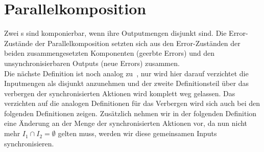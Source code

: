 \section{Parallelkomposition}
Zwei \EIO{}s sind komponierbar, wenn ihre Outputmengen disjunkt sind. Die
Error-Zustän\-de der Parallelkomposition setzten sich aus den Error-Zuständen der
beiden zusammengesetzten Komponenten (geerbte Errors) und den
unsynchronisierbaren Outputs (neue Errors) zusammen.\\
Die nächste Definition ist noch analog zu~\cite{Vogler2014EIO}, nur wird hier
darauf verzichtet die Inputmengen als disjunkt anzunehmen und der zweite
Definitionsteil über das verbergen der synchronisierten Aktionen wird
komplett weg gelassen. Das verzichten auf die analogen Definitionen für das
Verbergen wird sich auch bei den folgenden Definitionen zeigen. Zusätzlich
nehmen wir in der folgenden Definition eine Änderung an der Menge der
synchronisierten Aktionen vor, da nun nicht mehr $I_1\cap I_2 =\emptyset$
gelten muss, werden wir diese gemeinsamen Inputs synchronisieren. %

